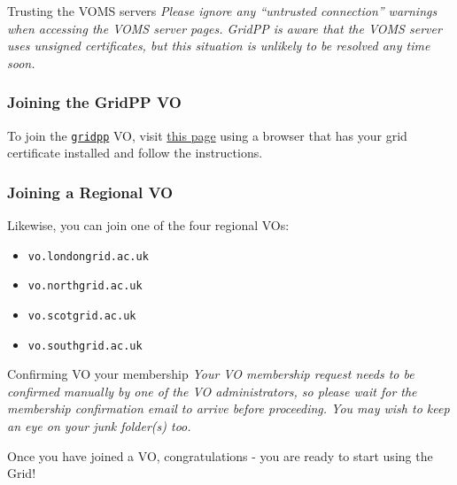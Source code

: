\begin{infobox}{Trusting the VOMS servers}
\emph{Please ignore any ``untrusted connection'' warnings when accessing the
VOMS server pages. GridPP is aware that the VOMS server uses unsigned
certificates, but this situation is unlikely to be resolved any time
soon.}
\end{infobox}

\subsubsection{Joining the GridPP VO}
\label{joining-the-gridpp-vo}

To join the
\href{https://voms.gridpp.ac.uk:8443/voms/gridpp}{\texttt{gridpp}} VO,
visit
\href{https://voms.gridpp.ac.uk:8443/voms/gridpp/register/start.action}{this
page} using a browser that has your grid certificate installed and
follow the instructions.

\subsubsection{Joining a Regional VO}
\label{joining-a-regional-vo}
Likewise, you can join one of the four regional VOs:

\begin{itemize}
\item
\texttt{vo.londongrid.ac.uk}
\item
\texttt{vo.northgrid.ac.uk}
\item
\texttt{vo.scotgrid.ac.uk}
\item
\texttt{vo.southgrid.ac.uk}
\end{itemize}

\begin{infobox}{Confirming VO your membership}
\emph{Your VO membership request needs to be confirmed manually by one of the
VO administrators, so please wait for the membership confirmation email
to arrive before proceeding. You may wish to keep an eye on your junk
folder(s) too.}
\end{infobox}

Once you have joined a VO, congratulations - you are ready to start
using the Grid!
